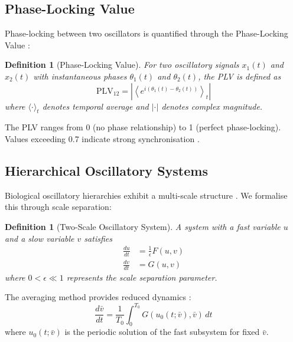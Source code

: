 \documentclass[12pt]{article}
\newtheorem{definition}[theorem]{Definition}
\theoremstyle{remark}
\begin{document}
\subsection{Phase-Locking Value}

Phase-locking between two oscillators is quantified through the Phase-Locking Value \citep{lachaux1999measuring}:

\begin{definition}[Phase-Locking Value]
For two oscillatory signals $x_1(t)$ and $x_2(t)$ with instantaneous phases $\theta_1(t)$ and $\theta_2(t)$, the PLV is defined as
\begin{equation}
\text{PLV}_{12} = \left|\left\langle e^{i(\theta_1(t) - \theta_2(t))}\right\rangle_t\right|
\label{eq:plv}
\end{equation}
where $\langle \cdot \rangle_t$ denotes temporal average and $| \cdot |$ denotes complex magnitude.
\end{definition}

The PLV ranges from 0 (no phase relationship) to 1 (perfect phase-locking). Values exceeding 0.7 indicate strong synchronisation \citep{mormann2000mean}.

\subsection{Hierarchical Oscillatory Systems}

Biological oscillatory hierarchies exhibit a multi-scale structure \citep{buzsaki2006rhythms}. We formalise this through scale separation:

\begin{definition}[Two-Scale Oscillatory System]
A system with a fast variable $u$ and a slow variable $v$ satisfies
\begin{align}
\frac{du}{dt} &= \frac{1}{\epsilon}F(u,v) \label{eq:fast_scale}\\
\frac{dv}{dt} &= G(u,v) \label{eq:slow_scale}
\end{align}
where $0 < \epsilon \ll 1$ represents the scale separation parameter.
\end{definition}

The averaging method provides reduced dynamics \citep{sanders2007averaging}:
\begin{equation}
\frac{d\bar{v}}{dt} = \frac{1}{T_0}\int_0^{T_0} G(u_0(t;\bar{v}), \bar{v}) \, dt
\label{eq:averaged_dynamics}
\end{equation}
where $u_0(t;\bar{v})$ is the periodic solution of the fast subsystem for fixed $\bar{v}$.
\end{document}

